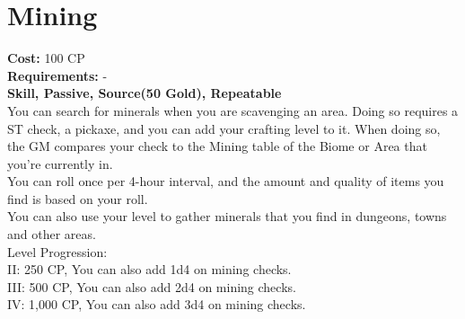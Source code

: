 \section{Mining}\label{perk:mining}
\textbf{Cost:} 100 CP\\
\textbf{Requirements:} -\\
\textbf{Skill, Passive, Source(50 Gold), Repeatable}\\
You can search for minerals when you are scavenging an area.
Doing so requires a ST check, a pickaxe, and you can add your crafting level to it.
When doing so, the GM compares your check to the Mining table of the Biome or Area that you're currently in.\\
You can roll once per 4-hour interval, and the amount and quality of items you find is based on your roll.\\
You can also use your level to gather minerals that you find in dungeons, towns and other areas.
\\
Level Progression:\\
II: 250 CP, You can also add 1d4 on mining checks.\\
III: 500 CP, You can also add 2d4 on mining checks.\\
IV: 1,000 CP, You can also add 3d4 on mining checks.\\